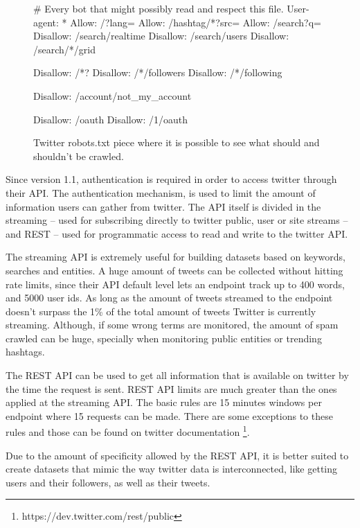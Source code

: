 \begin{figure}[htpb]
  \centering
  \begin{boxedverbatim}
  # Every bot that might possibly read and respect this file.
  User-agent: *
  Allow: /?lang=
  Allow: /hashtag/*?src=
  Allow: /search?q=%
  Disallow: /search/realtime
  Disallow: /search/users
  Disallow: /search/*/grid

  Disallow: /*?
  Disallow: /*/followers
  Disallow: /*/following

  Disallow: /account/not_my_account

  Disallow: /oauth
  Disallow: /1/oauth
  \end{boxedverbatim}
  \caption{Twitter robots.txt piece where it is possible to see what should and shouldn't be crawled.}
  \label{fig:twitterrobots}
\end{figure}

Since version 1.1, authentication is required in order to access twitter through their API. The authentication mechanism, is used to limit the amount of information users can gather from twitter. 
The API itself is divided in the streaming -- used for subscribing directly to twitter public, user or site streams --  and REST -- used for programmatic access to read and write to the twitter API.  

The streaming API is extremely useful for building datasets based on keywords, searches and entities. A huge amount of tweets can be collected without hitting rate limits, since their API default level lets an endpoint track up to 400 words, and 5000 user ids. As long as the amount of tweets streamed to the endpoint doesn't  surpass the 1\% of the total amount of tweets Twitter is currently streaming. Although, if some wrong terms are monitored, the amount of spam crawled can be huge, specially when monitoring public entities or trending hashtags. 

The REST API can be used to get all information that is available on twitter by the time the request is sent. REST API limits are much greater than the ones applied at the streaming API. The basic rules are 15 minutes windows per endpoint where 15 requests can be made. There are some exceptions to these rules and those can be found on twitter documentation \footnote{https://dev.twitter.com/rest/public}.


Due to the amount of specificity allowed by the REST API, it is better suited to create datasets that mimic the way twitter data is interconnected, like getting users and their followers, as well as their tweets.


